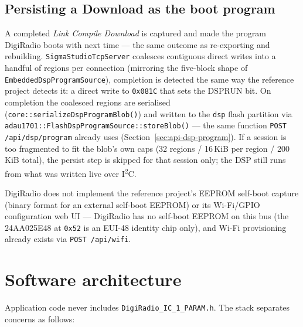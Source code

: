 \subsection{Persisting a Download as the boot program}

A completed \emph{Link Compile Download} is captured and made the program
DigiRadio boots with next time --- the same outcome as re-exporting and
rebuilding. \texttt{SigmaStudioTcpServer} coalesces contiguous direct writes
into a handful of regions per connection (mirroring the five-block shape
of \texttt{EmbeddedDspProgramSource}), completion is detected the same way
the reference project detects it: a direct write to \texttt{0x081C} that sets
the DSPRUN bit. On completion the coalesced regions are serialised
(\texttt{core::serializeDspProgramBlob()}) and written to the \texttt{dsp}
flash partition via \texttt{adau1701::FlashDspProgramSource::storeBlob()} ---
the same function \texttt{POST /api/dsp/program} already uses
(Section~\ref{sec:api-dsp-program}). If a session is too fragmented to fit the
blob's own caps (32 regions / 16\,KiB per region / 200\,KiB total), the
persist step is skipped for that session only; the DSP still runs from what
was written live over I\textsuperscript{2}C.

\begin{drcaution}
DigiRadio does not implement the reference project's EEPROM self-boot capture
(binary format for an external self-boot EEPROM) or its Wi-Fi/GPIO
configuration web UI --- DigiRadio has no self-boot EEPROM on this bus (the
24AA025E48 at \texttt{0x52} is an EUI-48 identity chip only), and Wi-Fi
provisioning already exists via \texttt{POST /api/wifi}.
\end{drcaution}

\section{Software architecture}
\label{sec:adau1701-stack}

Application code never includes \texttt{DigiRadio\_IC\_1\_PARAM.h}. The stack
separates concerns as follows:

